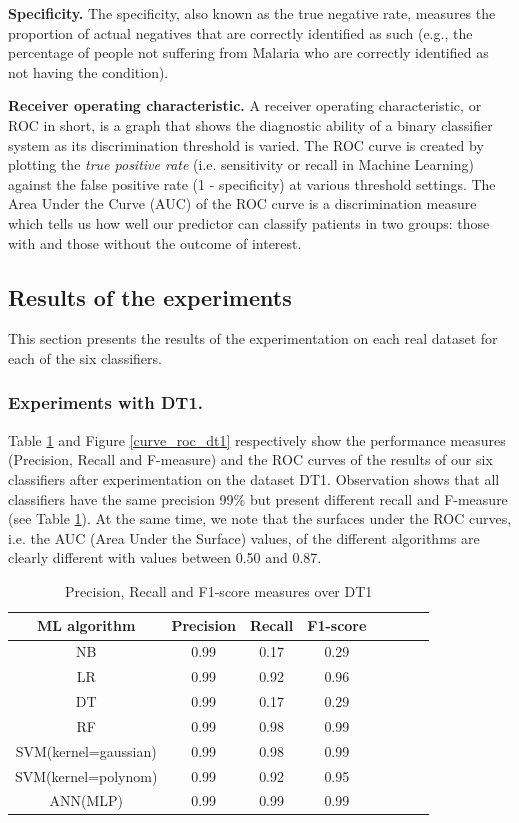\textbf{ Specificity.} 
The specificity, also known as the true negative rate, measures the proportion of actual negatives that are correctly identified as such 
(e.g., the percentage of people not suffering from Malaria  who are correctly identified as not having the condition).

\textbf{ Receiver operating characteristic.} A receiver operating characteristic, or ROC in short, is a graph
 that shows the diagnostic ability of a binary classifier system as its discrimination threshold is varied.
The ROC curve is created by plotting the \emph{true positive rate} (i.e. sensitivity or recall in Machine Learning) 
against the false positive rate (1 - specificity) at various threshold settings. 
The Area Under the Curve (AUC) of the ROC curve is a discrimination measure which tells us how well our predictor can classify patients in two groups: those with and those without the outcome of interest.

\subsection{Results of the experiments}
This section presents the results of the experimentation on each real dataset for each of the six classifiers. 


\subsubsection*{\bf Experiments with DT1.}
Table  \ref{perf-measure-dt1} and Figure \ref{curve_roc_dt1} respectively show the performance measures (Precision, Recall and F-measure) and the ROC curves of the results  of our six classifiers after experimentation on the  dataset DT1. Observation shows that all classifiers have the same precision 99\% but present different recall and F-measure (see Table \ref{perf-measure-dt1}). At the same time, we note that the surfaces under the ROC curves, i.e. the AUC (Area Under the Surface) values, of the different algorithms are clearly different with values between 0.50 and 0.87.
\begin{table}[!ht]
\centering
\begin{tabular}{*{6}{c}l r}
  \toprule
  \textbf{ML algorithm} & \textbf{Precision} & \textbf{Recall} & \textbf{F1-score} \\
   \midrule
  NB &0.99& 0.17  & 0.29 \\
  LR & 0.99 & 0.92  & 0.96\\
  DT &0.99 & 0.17&0.29\\
   RF &0.99 &0.98 &0.99\\
    SVM(kernel=gaussian) &0.99 &0.98 &0.99\\
    SVM(kernel=polynom) & 0.99&0.92&0.95\\
    ANN(MLP)&0.99&0.99&0.99\\
    \bottomrule
\end{tabular}
\caption{Precision, Recall and F1-score measures over DT1}\label{perf-measure-dt1}
\end{table}

